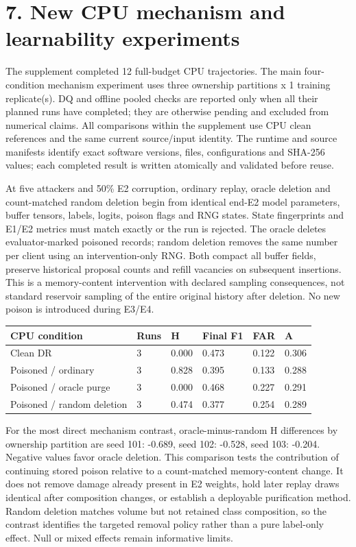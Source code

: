 \documentclass[
  10pt,
]{article}
\begin{document}
\hypertarget{new-cpu-mechanism-and-learnability-experiments}{%
\section{7. New CPU mechanism and learnability
experiments}\label{new-cpu-mechanism-and-learnability-experiments}}

The supplement completed 12 full-budget CPU trajectories. The main
four-condition mechanism experiment uses three ownership partitions x 1
training replicate(s). DQ and offline pooled checks are reported only
when all their planned runs have completed; they are otherwise pending
and excluded from numerical claims. All comparisons within the
supplement use CPU clean references and the same current source/input
identity. The runtime and source manifests identify exact software
versions, files, configurations and SHA-256 values; each completed
result is written atomically and validated before reuse.

At five attackers and 50\% E2 corruption, ordinary replay, oracle
deletion and count-matched random deletion begin from identical end-E2
model parameters, buffer tensors, labels, logits, poison flags and RNG
states. State fingerprints and E1/E2 metrics must match exactly or the
run is rejected. The oracle deletes evaluator-marked poisoned records;
random deletion removes the same number per client using an
intervention-only RNG. Both compact all buffer fields, preserve
historical proposal counts and refill vacancies on subsequent
insertions. This is a memory-content intervention with declared sampling
consequences, not standard reservoir sampling of the entire original
history after deletion. No new poison is introduced during E3/E4.

\begin{longtable}[]{@{}llllll@{}}
\toprule
CPU condition & Runs & H & Final F1 & FAR & A \\
\midrule
\endhead
Clean DR & 3 & 0.000 & 0.473 & 0.122 & 0.306 \\
Poisoned / ordinary & 3 & 0.828 & 0.395 & 0.133 & 0.288 \\
Poisoned / oracle purge & 3 & 0.000 & 0.468 & 0.227 & 0.291 \\
Poisoned / random deletion & 3 & 0.474 & 0.377 & 0.254 & 0.289 \\
\bottomrule
\end{longtable}

For the most direct mechanism contrast, oracle-minus-random H
differences by ownership partition are seed 101: -0.689, seed 102:
-0.528, seed 103: -0.204. Negative values favor oracle deletion. This
comparison tests the contribution of continuing stored poison relative
to a count-matched memory-content change. It does not remove damage
already present in E2 weights, hold later replay draws identical after
composition changes, or establish a deployable purification method.
Random deletion matches volume but not retained class composition, so
the contrast identifies the targeted removal policy rather than a pure
label-only effect. Null or mixed effects remain informative limits.
\end{document}
